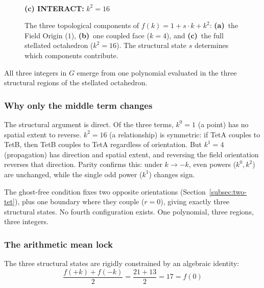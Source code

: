 \documentclass[aps,prd,preprint,superscriptaddress,showpacs,preprintnumbers,amsmath,amssymb,nofootinbib]{revtex4-2}
\begin{document}
\begin{figure}[H]
\begin{minipage}[b]{0.33\textwidth}
\\[4pt]
\textbf{(c) INTERACT:} $k^2 = 16$
\end{minipage}
\caption{The three topological components of $f(k) = 1 + s \cdot k + k^2$:
\textbf{(a)}~the Field Origin ($1$),
\textbf{(b)}~one coupled face ($k = 4$), and
\textbf{(c)}~the full stellated octahedron ($k^2 = 16$).
The structural state $s$ determines which components contribute.}
\label{fig:polynomial}
\end{figure}

All three integers in $G$ emerge from one polynomial evaluated in the three structural regions of the stellated octahedron.

\subsubsection*{Why only the middle term changes}

The structural argument is direct. Of the three terms, $k^0 = 1$ (a point) has no spatial extent to reverse. $k^2 = 16$ (a relationship) is symmetric: if TetA couples to TetB, then TetB couples to TetA regardless of orientation. But $k^1 = 4$ (propagation) has direction and spatial extent, and reversing the field orientation reverses that direction. Parity confirms this: under $k \to -k$, even powers ($k^0, k^2$) are unchanged, while the single odd power ($k^1$) changes sign.

The ghost-free condition fixes two opposite orientations (Section~\ref{subsec:two-tet}), plus one boundary where they couple ($r = 0$), giving exactly three structural states. No fourth configuration exists. One polynomial, three regions, three integers.

\subsubsection*{The arithmetic mean lock}

The three structural states are rigidly constrained by an algebraic identity:
\begin{equation}
\frac{f(+k) + f(-k)}{2} = \frac{21 + 13}{2} = 17 = f(0)
\label{eq:arithmetic-mean}
\end{equation}
\end{document}
